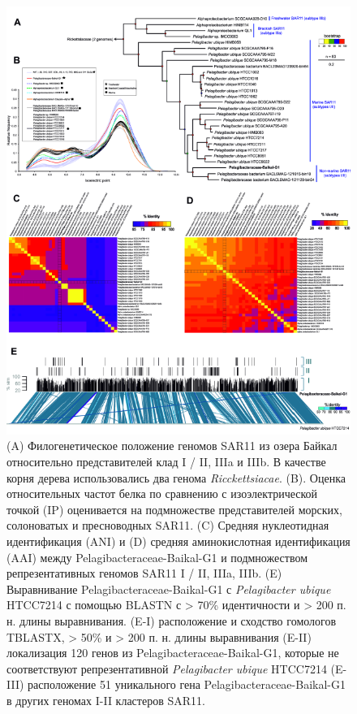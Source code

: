 \documentclass[a4paper,12pt,openany,final]{extreport}
\def\oldcaption{} \let\oldcaption=\caption
\def\caption{\stepcounter{captionsnum}\oldcaption}
\begin{document}
\begin{figure}\centering
  \includegraphics[width=0.8\linewidth]{media/image9.png}
  \caption{(A) Филогенетическое положение геномов SAR11 из озера Байкал
относительно представителей клад I / II, IIIa и IIIb. В качестве корня
дерева использовались два генома \emph{Ricckettsiacae}. (B). Оценка
относительных частот белка по сравнению с изоэлектрической точкой (IP)
оценивается на подмножестве представителей морских, солоноватых и
пресноводных SAR11. (C) Средняя нуклеотидная идентификация (ANI) и (D)
средняя аминокислотная идентификация (AAI) между
Pelagibacteraceae-Baikal-G1 и подмножеством репрезентативных геномов
SAR11 I / II, IIIa, IIIb. (E) Выравнивание Pelagibacteraceae-Baikal-G1 с
\emph{Pelagibacter ubique} HTCC7214 с помощью BLASTN с \textgreater{}
70\% идентичности и \textgreater{} 200 п. н. длины выравнивания. (E-I)
расположение и сходство гомологов TBLASTX, \textgreater{} 50\% и
\textgreater{} 200 п. н. длины выравнивания (E-II) локализация 120 генов
из Pelagibacteraceae-Baikal-G1, которые не соответствуют
репрезентативной \emph{Pelagibacter ubique} HTCC7214 (E- III)
расположение 51 уникального гена Pelagibacteraceae-Baikal-G1 в других
геномах I-II кластеров SAR11.}\label{fig:4-4}
\end{figure}
\end{document}
